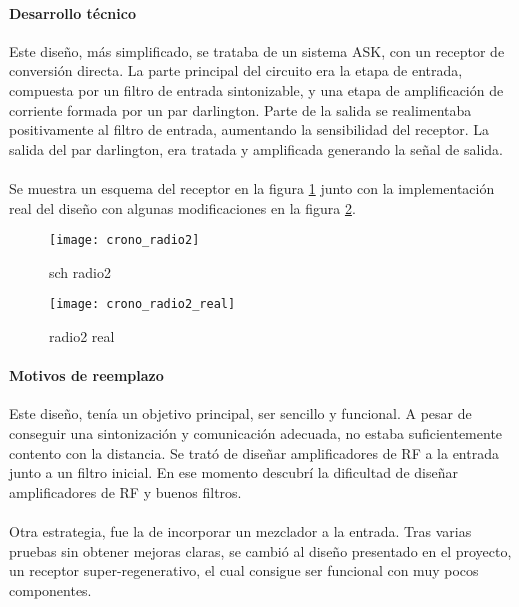 \paragraph{Desarrollo técnico}
Este diseño, más simplificado, se trataba de un sistema ASK, con un receptor de conversión directa. 
La parte principal del circuito era la etapa de entrada, compuesta por un filtro de entrada sintonizable, y una etapa de amplificación de corriente formada por un par darlington. Parte de la salida se realimentaba positivamente al filtro de entrada, aumentando la sensibilidad del receptor. La salida del par darlington, era tratada y amplificada generando la señal de salida. 
\paragraph{}
Se muestra un esquema del receptor en la figura \ref{fig:crono_radio2} junto con la implementaci\'on real del diseño con algunas modificaciones en la figura \ref{fig:crono_radio2_real}.
\begin{figure}[h!]
    \centering
    \texttt{[image: crono\_radio2]}
    \caption{sch radio2}
    \label{fig:crono_radio2}
\end{figure}

\begin{figure}[h!]
    \centering
    \texttt{[image: crono\_radio2\_real]}
    \caption{radio2 real}
    \label{fig:crono_radio2_real}
\end{figure}

\paragraph{Motivos de reemplazo}
Este diseño, tenía un objetivo principal, ser sencillo y funcional.
A pesar de conseguir una sintonización y comunicación adecuada, no estaba suficientemente contento con la distancia. Se trató de diseñar amplificadores de RF a la entrada junto a un filtro inicial. En ese momento descubrí la dificultad de diseñar amplificadores de RF y buenos filtros. 
\paragraph{}
Otra estrategia, fue la de incorporar un mezclador a la entrada. Tras varias pruebas sin obtener mejoras claras, se cambió al diseño presentado en el proyecto, un receptor super-regenerativo, el cual consigue ser funcional con muy pocos componentes.
